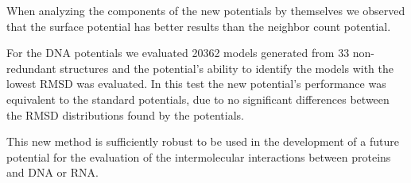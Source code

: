 \begin{singlespace}
When analyzing the components of the new potentials by themselves we observed that the surface potential has better results than the neighbor count potential.
\par
For the DNA potentials we evaluated 20362 models generated from 33 non-redundant structures and the potential's ability to identify the models with the lowest RMSD was evaluated. 
In this test the new potential's performance was equivalent to the standard potentials, due to no significant differences between the RMSD distributions found by the potentials.
\par
This new method is sufficiently robust to be used in the development of a future potential for the evaluation of the intermolecular interactions between proteins and DNA or RNA.
\end{singlespace}

